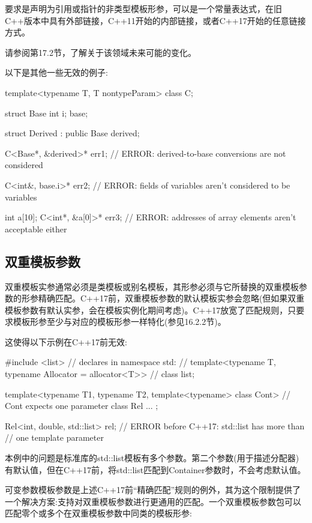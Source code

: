 要求是声明为引用或指针的非类型模板形参，可以是一个常量表达式，在旧C++版本中具有外部链接，C++11开始的内部链接，或者C++17开始的任意链接方式。

请参阅第17.2节，了解关于该领域未来可能的变化。

以下是其他一些无效的例子:

\begin{cpp}
template<typename T, T nontypeParam>
class C;

struct Base {
	int i;
} base;

struct Derived : public Base {
} derived;

C<Base*, &derived>* err1; // ERROR: derived-to-base conversions are not considered

C<int&, base.i>* err2; // ERROR: fields of variables aren’t considered to be variables

int a[10];
C<int*, &a[0]>* err3; // ERROR: addresses of array elements aren’t acceptable either
\end{cpp}


\subsection{双重模板参数}

双重模板实参通常必须是类模板或别名模板，其形参必须与它所替换的双重模板参数的形参精确匹配。C++17前，双重模板参数的默认模板实参会忽略(但如果双重模板参数有默认实参，会在模板实例化期间考虑)。C++17放宽了匹配规则，只要求模板形参至少与对应的模板形参一样特化(参见16.2.2节)。

这使得以下示例在C++17前无效:

\begin{cpp}
#include <list>
	// declares in namespace std:
	// template<typename T, typename Allocator = allocator<T>>
	// class list;

template<typename T1, typename T2,
		template<typename> class Cont> // Cont expects one parameter
class Rel {
	...
};

Rel<int, double, std::list> rel; // ERROR before C++17: std::list has more than
								// one template parameter
\end{cpp}

本例中的问题是标准库的std::list模板有多个参数。第二个参数(用于描述分配器)有默认值，但在C++17前，将std::list匹配到Container参数时，不会考虑默认值。

可变参数模板参数是上述C++17前“精确匹配”规则的例外，其为这个限制提供了一个解决方案:支持对双重模板参数进行更通用的匹配。一个双重模板参数包可以匹配零个或多个在双重模板参数中同类的模板形参:


